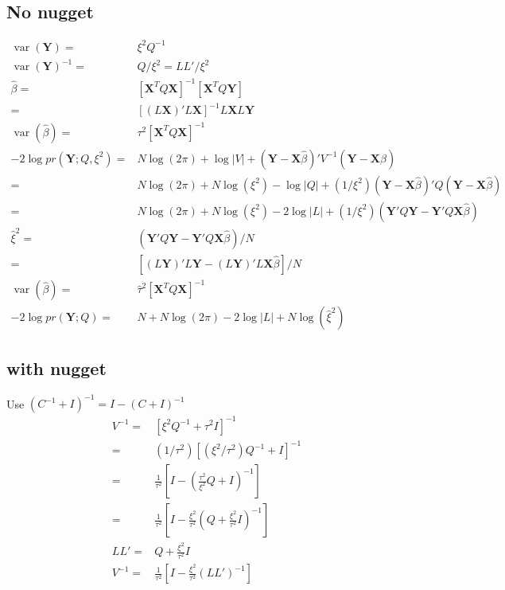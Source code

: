 \documentclass[12pt]{article}
\DeclareMathOperator{\var}{var}
\begin{document}
\subsection{No nugget}

\begin{align*}
\var(\mathbf{Y}) = &\xi^2 Q^{-1} \\
\var(\mathbf{Y})^{-1} = &Q/\xi^2 = L L'/\xi^2\\
\hat\beta = &[\mathbf{X}^T
  Q \mathbf{X}]^{-1}
  [\mathbf{X}^T
  Q \mathbf{Y}]\\
   = & [(L\mathbf{X})'L\mathbf{X}]^{-1}L\mathbf{X}L\mathbf{Y}\\
\var(\hat\beta) = & \tau^2 [\mathbf{X}^T  Q \mathbf{X}]^{-1}\\
-2 \log pr(\mathbf{Y};Q, \xi^2) = &
N \log(2\pi) +
\log| V| + 
( \mathbf{Y} -\mathbf{X}\hat\beta)  '
  V^{-1}
(\mathbf{Y} - \mathbf{X}\hat\beta)\\
= & N \log(2\pi) + N \log(\xi^2) - \log|Q| + (1/\xi^2)( \mathbf{Y} -\mathbf{X}\hat\beta)  '
  Q
(\mathbf{Y} - \mathbf{X}\hat\beta)\\
= & N \log(2\pi) + N \log(\xi^2) - 2\log|L| +
(1/\xi^2)( \mathbf{Y}'
  Q \mathbf{Y} - \mathbf{Y}'
  Q \mathbf{X}\hat\beta)\\
\hat\xi^2 = & ( \mathbf{Y}'
  Q \mathbf{Y} - \mathbf{Y}'
  Q \mathbf{X}\hat\beta)/N\\
  = & [(L\mathbf{Y})'L\mathbf{Y} - (L\mathbf{Y})'L\mathbf{X}\hat\beta]/N\\
 \var(\hat\beta) = & \hat\tau^2 [\mathbf{X}^T  Q \mathbf{X}]^{-1}\\ 
 -2 \log pr(\mathbf{Y};Q)=&  N + N \log(2\pi)  - 2\log|L|+N \log(\hat\xi^2)
\end{align*}



\subsection*{with nugget}

Use $(C^{-1} + I)^{-1} = I-(C+I)^{-1}$ 
\begin{align*}
V^{-1} = &[\xi^2 Q^{-1} + \tau^2 I]^{-1}\\
=& (1/\tau^2)  [(\xi^2/\tau^2)Q^{-1} + I]^{-1}\\
 = & \frac{1}{\tau^2} \left[ I -   \left(\frac{\tau^2 }{\xi^2} Q +    I\right)^{-1}  \right]\\
 = & \frac{1}{\tau^2} \left[ I -  \frac{\xi^2 }{\tau^2} \left(Q +  \frac{\xi^2 }{\tau^2}  I\right)^{-1}  \right]\\
L L'= &  Q +  \frac{\xi^2 }{\tau^2}  I\\
V^{-1} =& \frac{1}{\tau^2} \left[ I -  \frac{\xi^2 }{\tau^2}\left(L L'  \right)^{-1}  \right]\\
\end{align*}
\end{document}

